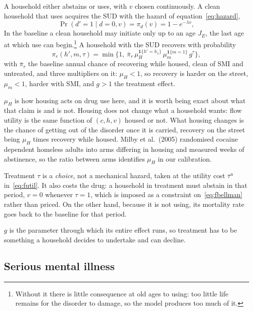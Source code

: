 \documentclass[10pt]{article}
\begin{document}
A household either abstains or uses, with $v$ chosen continuously. A clean
household that uses acquires the SUD with the hazard of
equation~\eqref{eq:hazard},
\begin{equation}\label{eq:fd}
\Pr(d'=1\mid d=0,v)=\pi_d(v)=1-e^{-\lambda v},
\end{equation}
In the baseline a clean household may initiate only up to an age
$J_E$, the last age at which use can begin.\footnote{Without it there
is little consequence at old ages to using: too little life remains for the
disorder to damage, so the model produces too much of it.} A household with the SUD recovers with probability
\begin{equation}\label{eq:frecover}
\pi_r(h',m,\tau)=\min\Big\{1,\ \bar\pi_r\,
\mu_H^{\mathbf{1}\{h'=h_1\}}\,\mu_m^{\mathbf{1}\{m=1\}}\,g^{\tau}\Big\},
\end{equation}
with $\bar\pi_r$ the baseline annual chance of recovering while housed,
clean of SMI and untreated, and three multipliers on it:
$\mu_H<1$, so recovery is harder on the street, $\mu_m<1$, harder with
SMI, and $g>1$ the treatment effect.

$\mu_H$ is how housing acts on drug use here, and it is worth being
exact about what that claim is and is not. Housing does not change what a
household wants: flow utility is the same function of $(c,h,v)$ housed or not.
What housing changes is the
chance of getting out of the disorder once it is carried, recovery on the street
being $\mu_H$ times recovery while housed.
Milby et al.\ (2005)
randomised cocaine dependent homeless adults into arms differing in housing and
measured weeks of abstinence, so the ratio between arms identifies $\mu_H$
in our calibration.


Treatment $\tau$ is a \emph{choice}, not a mechanical hazard, taken at the
utility cost $\bar\tau^u$ in~\eqref{eq:futil}. It also costs the drug: a
household in treatment must abstain in that period, $v=0$ whenever $\tau=1$, which
is imposed as a constraint on~\eqref{eq:fbellman} rather than priced.
On the other hand, because it is not using, its mortality rate goes back
to the baseline for that period.

$g$ is the
parameter through
which its entire effect runs, so treatment has to be something a household decides
to undertake and can decline.

\subsection{Serious mental illness}\label{sec:fsmi}
\end{document}
